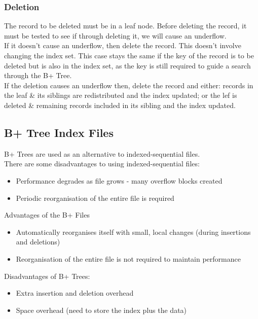 \subsubsection{Deletion}
The record to be deleted must be in a leaf node. Before deleting the record, it must be tested to see if through deleting it, we will cause an underflow.\\

If it doesn't cause an underflow, then delete the record. This doesn't involve changing the index set. This case stays the same if the key of the record is to be deleted but is also in the index set, as the key is still required to guide a search through the B+ Tree.\\

If the deletion causes an underflow then, delete the record and either: records in the leaf \& its siblings are redistributed and the index updated; or the lef is deleted \& remaining records included in its sibling and the index updated.

\subsection{B+ Tree Index Files}
B+ Trees are used as an alternative to indexed-sequential files.\\

There are some disadvantages to using indexed-sequential files:
\begin{itemize}
    \item Performance degrades as file grows - many overflow blocks created
    \item Periodic reorganisation of the entire file is required 
\end{itemize}

Advantages of the B+ Files
\begin{itemize}
    \item Automatically reorganises itself with small, local changes (during insertions and deletions)
    \item Reorganisation of the entire file is not required to maintain performance
\end{itemize}

Disadvantages of B+ Trees:
\begin{itemize}
    \item Extra insertion and deletion overhead
    \item Space overhead (need to store the index plus the data)
\end{itemize}

